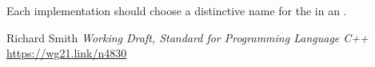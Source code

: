 \documentclass{wg21}
\begin{document}
\begin{note}
	Each implementation should choose a distinctive name for the
	 in an .
\end{note}


 
\begin{thebibliography}{9}
    
    Richard Smith
    \emph{Working Draft, Standard for Programming Language C++}\newline
    \url{https://wg21.link/n4830}
    
\end{thebibliography}
\end{document}
